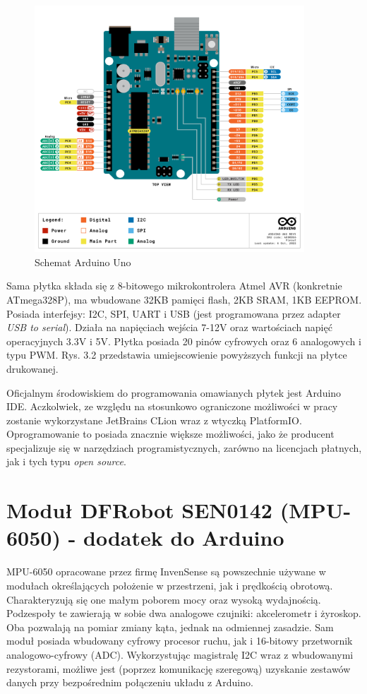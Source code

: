 \begin{figure}[H]
    \centering
    \includegraphics[width=0.9\textwidth]{pictures/uno.png}
    \caption{Schemat Arduino Uno \cite{Ardocs}}
    \label{fig:ard_vague}
\end{figure}

Sama płytka składa się z 8-bitowego mikrokontrolera Atmel AVR (konkretnie ATmega328P), ma wbudowane 32KB pamięci flash, 2KB SRAM, 1KB EEPROM. Posiada interfejsy: I2C, SPI, UART i USB (jest programowana przez adapter \textit{USB to serial}). Działa na napięciach wejścia 7-12V oraz wartościach napięć operacyjnych 3.3V i 5V. Płytka posiada 20 pinów cyfrowych oraz 6 analogowych i typu PWM. Rys. 3.2 przedstawia umiejscowienie powyższych funkcji na płytce drukowanej.

Oficjalnym środowiskiem do programowania omawianych płytek jest Arduino IDE. Aczkolwiek, ze względu na stosunkowo ograniczone możliwości w pracy zostanie wykorzystane JetBrains CLion wraz z wtyczką PlatformIO. Oprogramowanie to posiada znacznie większe możliwości, jako że producent specjalizuje się w narzędziach programistycznych, zarówno na licencjach płatnych, jak i tych typu \textit{open source}.

\section{Moduł DFRobot SEN0142 (MPU-6050) - dodatek do Arduino}

MPU-6050 opracowane przez firmę InvenSense są powszechnie używane w modułach określających położenie w przestrzeni, jak i prędkością obrotową. Charakteryzują się one małym poborem mocy oraz wysoką wydajnością. Podzespoły te zawierają w sobie dwa analogowe czujniki: akcelerometr i żyroskop. Oba pozwalają na pomiar zmiany kąta, jednak na odmiennej zasadzie. Sam moduł posiada wbudowany cyfrowy procesor ruchu, jak i 16-bitowy przetwornik analogowo-cyfrowy (ADC). Wykorzystując magistralę I2C wraz z wbudowanymi rezystorami, możliwe jest (poprzez komunikację szeregową) uzyskanie zestawów danych przy bezpośrednim połączeniu układu z Arduino.

